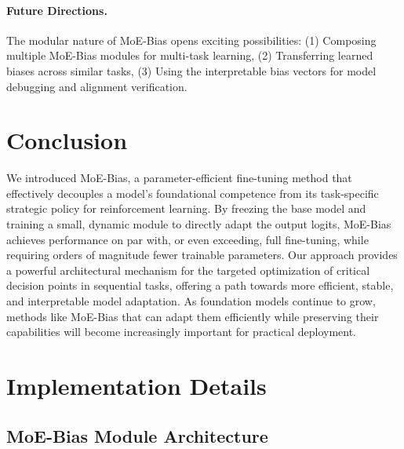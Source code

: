 \documentclass{article}
\begin{document}
\paragraph{Future Directions.}
The modular nature of MoE-Bias opens exciting possibilities: (1) Composing multiple MoE-Bias modules for multi-task learning, (2) Transferring learned biases across similar tasks, (3) Using the interpretable bias vectors for model debugging and alignment verification.


\section{Conclusion}

We introduced MoE-Bias, a parameter-efficient fine-tuning method that effectively decouples a model's foundational competence from its task-specific strategic policy for reinforcement learning. By freezing the base model and training a small, dynamic module to directly adapt the output logits, MoE-Bias achieves performance on par with, or even exceeding, full fine-tuning, while requiring orders of magnitude fewer trainable parameters. Our approach provides a powerful architectural mechanism for the targeted optimization of critical decision points in sequential tasks, offering a path towards more efficient, stable, and interpretable model adaptation. As foundation models continue to grow, methods like MoE-Bias that can adapt them efficiently while preserving their capabilities will become increasingly important for practical deployment.





\newpage
\appendix
\section{Implementation Details}
\label{sec:appendix_implementation}

\subsection{MoE-Bias Module Architecture}
\end{document}
